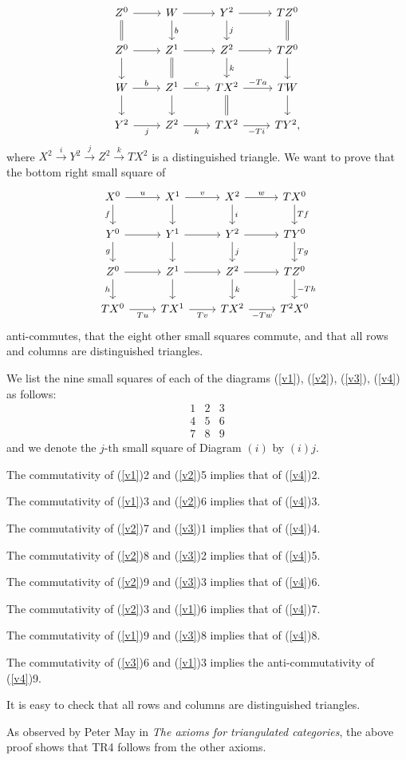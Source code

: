 \documentclass[12pt]{article}
\theoremstyle{remark}
\begin{document}
%
\begin{equation}\label{v3}
\begin{tikzcd}
Z^0\ar{r}\ar[equal]{d}&W\ar{d}{b}\ar{r}&Y^2\ar{d}{j}\ar{r}&TZ^0\ar[equal]{d}\\
Z^0\ar{d}\ar{r}&Z^1\ar{r}\ar[equal]{d}&Z^2\ar{d}{k}\ar{r}&TZ^0\ar{d}\\
W\ar{d}\ar{r}{b}&Z^1\ar{d}\ar{r}{c}&TX^2\ar{r}{-Ta}\ar[equal]{d}&TW\ar{d}\\
Y^2\ar{r}[swap]{j}&Z^2\ar{r}[swap]{k}&TX^2\ar{r}[swap]{-Ti}&TY^2,
\end{tikzcd}
\end{equation}
%
where $X^2\overset{i}{\to}Y^2\overset{j}{\to}Z^2\overset{k}{\to}TX^2$ is a distinguished triangle. We want to prove that the bottom right small square of 
%
\begin{equation}\label{v4}
\begin{tikzcd}
X^0\ar{r}{u}\ar{d}[swap]{f}&X^1\ar{d}\ar{r}{v}&X^2\ar{d}{i}\ar{r}{w}&TX^0\ar{d}{Tf}\\ 
Y^0\ar{r}\ar{d}[swap]{g}&Y^1\ar{d}\ar{r}&Y^2\ar{d}{j}\ar{r}&TY^0\ar{d}{Tg}\\ 
Z^0\ar{r}\ar{d}[swap]{h}&Z^1\ar{d}\ar{r}&Z^2\ar{d}{k}\ar{r}&TZ^0\ar{d}{-Th}\\ 
TX^0\ar{r}[swap]{Tu}&TX^1\ar{r}[swap]{Tv}&TX^2\ar{r}[swap]{-Tw}&T^2X^0
\end{tikzcd}
\end{equation}
%
anti-commutes, that the eight other small squares commute, and that all rows and columns are distinguished triangles.

We list the nine small squares of each of the diagrams (\ref{v1}), (\ref{v2}), (\ref{v3}), (\ref{v4}) as follows:
$$
\begin{matrix}1&2&3\\ 4&5&6\\ 7&8&9
\end{matrix}
$$ 
and we denote the $j$-th small square of Diagram $(i)$ by $(i)j$. 

The commutativity of (\ref{v1})2 and (\ref{v2})5 implies that of (\ref{v4})2. 

The commutativity of (\ref{v1})3 and (\ref{v2})6 implies that of (\ref{v4})3.

The commutativity of (\ref{v2})7 and (\ref{v3})1 implies that of (\ref{v4})4.

The commutativity of (\ref{v2})8 and (\ref{v3})2 implies that of (\ref{v4})5. 

The commutativity of (\ref{v2})9 and (\ref{v3})3 implies that of (\ref{v4})6. 

The commutativity of (\ref{v2})3 and (\ref{v1})6 implies that of (\ref{v4})7. 

The commutativity of (\ref{v1})9 and (\ref{v3})8 implies that of (\ref{v4})8. 

The commutativity of (\ref{v3})6 and (\ref{v1})3 implies the anti-commutativity of (\ref{v4})9. 

It is easy to check that all rows and columns are distinguished triangles.

As observed by Peter May in \emph{The axioms for triangulated categories}, the above proof shows that TR4 follows from the other axioms.
%
%
\end{document}
